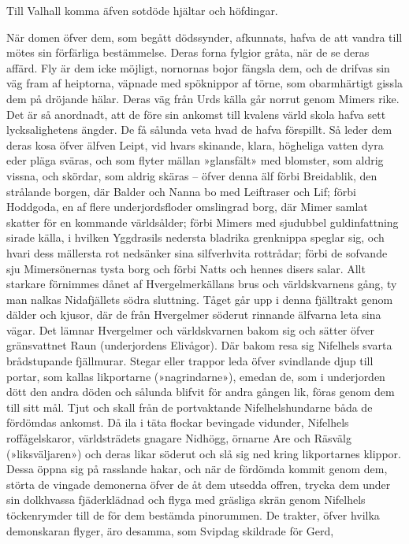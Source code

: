 Till Valhall komma äfven sotdöde hjältar och höfdingar.

När domen öfver dem, som begått dödssynder, afkunnats, hafva de att
vandra till mötes sin förfärliga bestämmelse. Deras forna fylgior gråta,
när de se deras affärd. Fly är dem icke möjligt, nornornas bojor fängsla
dem, och de drifvas sin väg fram af heiptorna, väpnade med spöknippor af
törne, som obarmhärtigt gissla dem på dröjande hälar. Deras väg från
Urds källa går norrut genom Mimers rike. Det är så anordnadt, att de
före sin ankomst till kvalens värld skola hafva sett lycksalighetens
ängder. De få sålunda veta hvad de hafva förspillt. Så leder dem deras
kosa öfver älfven Leipt, vid hvars skinande, klara, högheliga vatten
dyra eder pläga sväras, och som flyter mällan »glansfält» med blomster,
som aldrig vissna, och skördar, som aldrig skäras -- öfver denna älf
förbi Breidablik, den strålande borgen, där Balder och Nanna bo med
Leiftraser och Lif; förbi Hoddgoda, en af flere underjordsfloder
omslingrad borg, där Mimer samlat skatter för en kommande världsålder;
förbi Mimers med sjudubbel guldinfattning sirade källa, i hvilken
Yggdrasils nedersta bladrika grenknippa speglar sig, och hvari dess
mällersta rot nedsänker sina silfverhvita rottrådar; förbi de sofvande
sju Mimersönernas tysta borg och förbi Natts och hennes
disers salar. Allt starkare förnimmes dånet af Hvergelmerkällans brus
och världskvarnens gång, ty man nalkas Nidafjällets södra sluttning.
Tåget går upp i denna fjälltrakt genom dälder och kjusor, där de från
Hvergelmer söderut rinnande älfvarna leta sina vägar. Det lämnar
Hvergelmer och världskvarnen bakom sig och sätter öfver gränsvattnet
Raun (underjordens Elivågor). Där bakom resa sig Nifelhels svarta
brådstupande fjällmurar. Stegar eller trappor leda öfver svindlande djup
till portar, som kallas likportarne (»nagrindarne»), emedan de, som i
underjorden dött den andra döden och sålunda blifvit för andra gången
lik, föras genom dem till sitt mål. Tjut och skall från de portvaktande
Nifelhelshundarne båda de fördömdas ankomst. Då ila i täta flockar
bevingade vidunder, Nifelhels roffågelskaror, världsträdets gnagare
Nidhögg, örnarne Are och Räsvälg (»liksväljaren») och deras likar
söderut och slå sig ned kring likportarnes klippor. Dessa öppna sig på
rasslande hakar, och när de fördömda kommit genom dem, störta de vingade
demonerna öfver de åt dem utsedda offren, trycka dem under sin
dolkhvassa fjäderklädnad och flyga med gräsliga skrän genom Nifelhels
töckenrymder till de för dem bestämda pinorummen. De trakter, öfver
hvilka demonskaran flyger, äro desamma, som Svipdag skildrade för Gerd,
